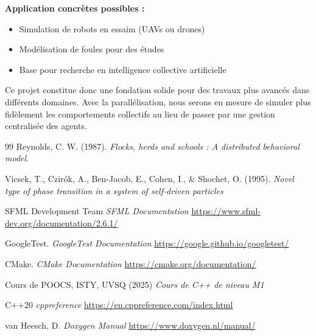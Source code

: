 \documentclass[11pt,a4paper]{article}
\begin{document}
\textbf{Application concrètes possibles :}
\begin{itemize}
    \item Simulation de robots en essaim (UAVs ou drones)
    \item Modélisation de foules pour des études
    \item Base pour recherche en intelligence collective artificielle
\end{itemize}

Ce projet constitue donc une fondation solide pour des travaux plus avancés dans différents domaines. Avec la parallélisation, nous serons en mesure de simuler plus fidèlement les comportements collectifs au lieu de passer par une gestion centralisée des agents.

\newpage
\begin{thebibliography}{99}
    Reynolds, C. W. (1987).
    \textit{Flocks, herds and schools : A distributed behavioral model}.

    Vicsek, T., Czirók, A., Ben-Jacob, E., Cohen, I., \& Shochet, O. (1995).
    \textit{Novel type of phase transition in a system of self-driven particles}

    SFML Development Team
    \textit{SFML Documentation} \url{https://www.sfml-dev.org/documentation/2.6.1/}

    GoogleTest. 
    \textit{GoogleTest Documentation} \url{https://google.github.io/googletest/}

    CMake. 
    \textit{CMake Documentation} \url{https://cmake.org/documentation/}

    Cours de POOCS, ISTY, UVSQ (2025)
    \textit{Cours de C++ de niveau M1}

    C++20
    \textit{cppreference} \url{https://en.cppreference.com/index.html}

    van Heesch, D.
    \textit{Doxygen Manual} \url{https://www.doxygen.nl/manual/}
\end{thebibliography}
\end{document}
